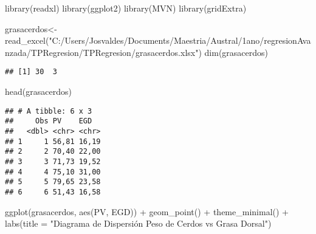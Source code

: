 \documentclass[
]{article}
\newenvironment{Shaded}{\begin{snugshade}}{\end{snugshade}}
\newcommand{\AttributeTok}[1]{\textcolor[rgb]{0.77,0.63,0.00}{#1}}
\newcommand{\FunctionTok}[1]{\textcolor[rgb]{0.00,0.00,0.00}{#1}}
\newcommand{\NormalTok}[1]{#1}
\newcommand{\OtherTok}[1]{\textcolor[rgb]{0.56,0.35,0.01}{#1}}
\newcommand{\SpecialCharTok}[1]{\textcolor[rgb]{0.00,0.00,0.00}{#1}}
\newcommand{\StringTok}[1]{\textcolor[rgb]{0.31,0.60,0.02}{#1}}
\begin{document}
\begin{Shaded}
\begin{Highlighting}[]
\FunctionTok{library}\NormalTok{(readxl)}
\FunctionTok{library}\NormalTok{(ggplot2)}
\FunctionTok{library}\NormalTok{(MVN)}
\FunctionTok{library}\NormalTok{(gridExtra)}

\NormalTok{grasacerdos}\OtherTok{\textless{}{-}}\FunctionTok{read\_excel}\NormalTok{(}\StringTok{"C:/Users/Josvaldes/Documents/Maestria/Austral/1ano/regresionAvanzada/TPRegresion/TPRegresion/grasacerdos.xlsx"}\NormalTok{)}
\FunctionTok{dim}\NormalTok{(grasacerdos)}
\end{Highlighting}
\end{Shaded}

\begin{verbatim}
## [1] 30  3
\end{verbatim}

\begin{Shaded}
\begin{Highlighting}[]
\FunctionTok{head}\NormalTok{(grasacerdos)}
\end{Highlighting}
\end{Shaded}

\begin{verbatim}
## # A tibble: 6 x 3
##     Obs PV    EGD  
##   <dbl> <chr> <chr>
## 1     1 56,81 16,19
## 2     2 70,40 22,00
## 3     3 71,73 19,52
## 4     4 75,10 31,00
## 5     5 79,65 23,58
## 6     6 51,43 16,58
\end{verbatim}

\begin{Shaded}
\end{Shaded}

\begin{Shaded}
\begin{Highlighting}[]
\FunctionTok{ggplot}\NormalTok{(grasacerdos, }\FunctionTok{aes}\NormalTok{(PV, EGD)) }\SpecialCharTok{+} 
  \FunctionTok{geom\_point}\NormalTok{() }\SpecialCharTok{+} \FunctionTok{theme\_minimal}\NormalTok{() }\SpecialCharTok{+} \FunctionTok{labs}\NormalTok{(}\AttributeTok{title =} \StringTok{"Diagrama de Dispersión Peso de Cerdos vs Grasa Dorsal"}\NormalTok{)}
\end{Highlighting}
\end{Shaded}
\end{document}
